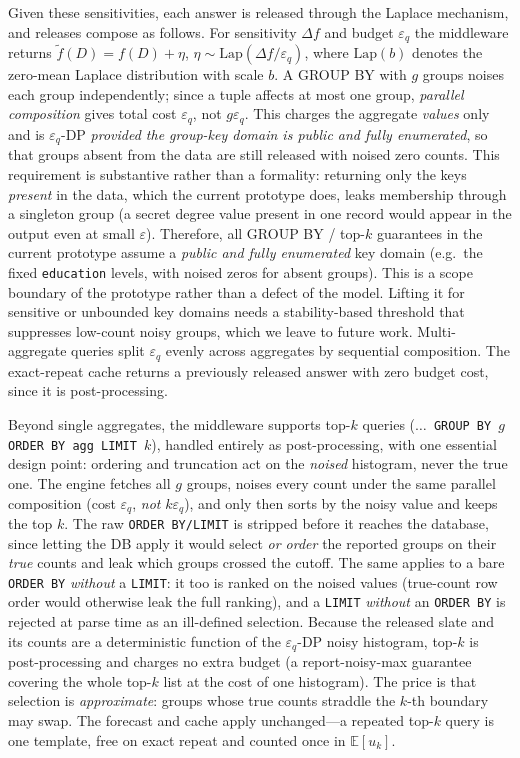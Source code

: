 \documentclass[sigconf,nonacm]{acmart}
\newcommand{\eps}{\varepsilon}
\newcommand{\E}{\mathbb{E}}
\newcommand{\Lap}{\mathrm{Lap}}
\begin{document}
Given these sensitivities, each answer is released through the Laplace mechanism, and releases compose as follows. For sensitivity $\Delta f$ and budget $\eps_q$ the middleware returns $\tilde f(D)=f(D)+\eta$, $\eta\sim\Lap(\Delta f/\eps_q)$, where $\Lap(b)$ denotes the zero-mean Laplace distribution with scale $b$. A GROUP BY with $g$ groups noises each group independently; since a tuple affects at most one group, \emph{parallel composition} gives total cost $\eps_q$, not $g\eps_q$. This charges the aggregate \emph{values} only and is $\eps_q$-DP \emph{provided the group-key domain is public and fully enumerated}, so that groups absent from the data are still released with noised zero counts. This requirement is substantive rather than a formality: returning only the keys \emph{present} in the data, which the current prototype does, leaks membership through a singleton group (a secret degree value present in one record would appear in the output even at small $\eps$). Therefore, all GROUP BY / top-$k$ guarantees in the current prototype assume a \emph{public and fully enumerated} key domain (e.g.\ the fixed \texttt{education} levels, with noised zeros for absent groups). This is a scope boundary of the prototype rather than a defect of the model. Lifting it for sensitive or unbounded key domains needs a stability-based threshold that suppresses low-count noisy groups, which we leave to future work. Multi-aggregate queries split $\eps_q$ evenly across aggregates by sequential composition. The exact-repeat cache returns a previously released answer with zero budget cost, since it is post-processing.

Beyond single aggregates, the middleware supports top-$k$ queries (\texttt{$\ldots$ GROUP BY $g$ ORDER BY agg LIMIT $k$}), handled entirely as post-processing, with one essential design point: ordering and truncation act on the \emph{noised} histogram, never the true one. The engine fetches all $g$ groups, noises every count under the same parallel composition (cost $\eps_q$, \emph{not} $k\eps_q$), and only then sorts by the noisy value and keeps the top $k$. The raw \texttt{ORDER BY/LIMIT} is stripped before it reaches the database, since letting the DB apply it would select \emph{or order} the reported groups on their \emph{true} counts and leak which groups crossed the cutoff. The same applies to a bare \texttt{ORDER BY} \emph{without} a \texttt{LIMIT}: it too is ranked on the noised values (true-count row order would otherwise leak the full ranking), and a \texttt{LIMIT} \emph{without} an \texttt{ORDER BY} is rejected at parse time as an ill-defined selection. Because the released slate and its counts are a deterministic function of the $\eps_q$-DP noisy histogram, top-$k$ is post-processing and charges no extra budget (a report-noisy-max guarantee covering the whole top-$k$ list at the cost of one histogram). The price is that selection is \emph{approximate}: groups whose true counts straddle the $k$-th boundary may swap. The forecast and cache apply unchanged---a repeated top-$k$ query is one template, free on exact repeat and counted once in $\E[u_k]$.
\end{document}
